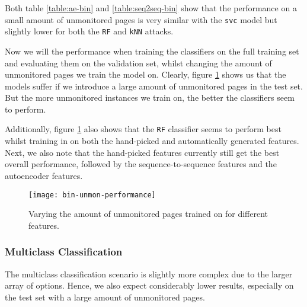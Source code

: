 Both table \ref{table:ae-bin} and \ref{table:seq2seq-bin} show that the performance on a small amount of unmonitored pages is very similar with the \texttt{svc} model but slightly lower for both the \texttt{RF} and \texttt{kNN} attacks.

\newpage

Now we will the performance when training the classifiers on the full training set and evaluating them on the validation set, whilst changing the amount of unmonitored pages we train the model on.
Clearly, figure \ref{fig:bin-unmon-performance} shows us that the models suffer if we introduce a large amount of unmonitored pages in the test set.
But the more unmonitored instances we train on, the better the classifiers seem to perform.

Additionally, figure \ref{fig:bin-unmon-performance} also shows that the \texttt{RF} classifier seems to perform best whilst training in on both the hand-picked and automatically generated features.
Next, we also note that the hand-picked features currently still get the best overall performance, followed by the sequence-to-sequence features and the autoencoder features.

\begin{figure}[ht]
  \centering
  \texttt{[image: bin-unmon-performance]}
  \caption{Varying the amount of unmonitored pages trained on for different features.}
  \label{fig:bin-unmon-performance}
\end{figure}

\subsubsection{Multiclass Classification}

The multiclass classification scenario is slightly more complex due to the larger array of options.
Hence, we also expect considerably lower results, especially on the test set with a large amount of unmonitored pages.

